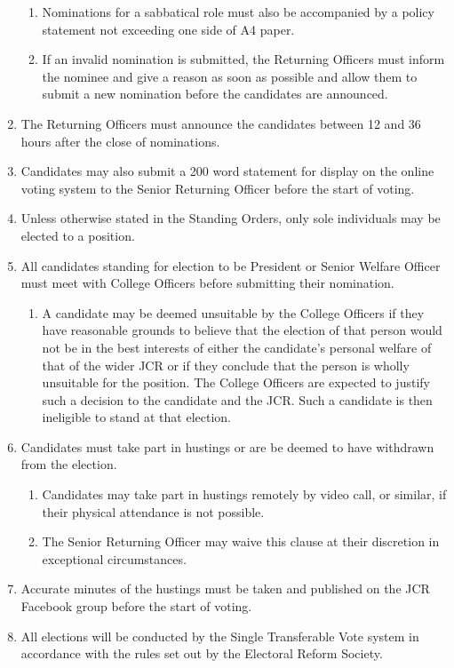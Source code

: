 \documentclass[12pt]{article}
\begin{document}
\begin{enumerate}
\begin{enumerate}
        \item Nominations for a sabbatical role must also be accompanied by a policy statement not exceeding one side of A4 paper.
        \item If an invalid nomination is submitted, the Returning Officers must inform the nominee and give a reason as soon as possible and allow them to submit a new nomination before the candidates are announced.
    \end{enumerate}
    \item The Returning Officers must announce the candidates between 12 and 36 hours after the close of nominations.
    \item Candidates may also submit a 200 word statement for display on the online voting system to the Senior Returning Officer before the start of voting.
    \item Unless otherwise stated in the Standing Orders, only sole individuals may be elected to a position.
    \item All candidates standing for election to be President or Senior Welfare Officer must meet with College Officers before submitting their nomination.
    \begin{enumerate}
        \item A candidate may be deemed unsuitable by the College Officers if they have reasonable grounds to believe that the election of that person would not be in the best interests of either the candidate’s personal welfare of that of the wider JCR or if they conclude that the person is wholly unsuitable for the position. The College Officers are expected to justify such a decision to the candidate and the JCR. Such a candidate is then ineligible to stand at that election.
    \end{enumerate}
    \item Candidates must take part in hustings or are be deemed to have withdrawn from the election.
    \begin{enumerate}
        \item Candidates may take part in hustings remotely by video call, or similar, if their physical attendance is not possible.
        \item The Senior Returning Officer may waive this clause at their discretion in exceptional circumstances.
    \end{enumerate}
    \item Accurate minutes of the hustings must be taken and published on the JCR Facebook group before the start of voting.
    \item All elections will be conducted by the Single Transferable Vote system in accordance with the rules set out by the Electoral Reform Society.

\end{enumerate}
\end{document}
